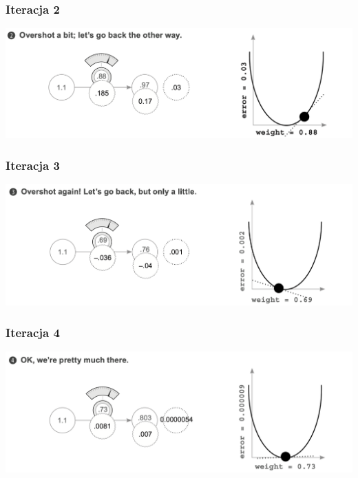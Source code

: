 \documentclass[smaller]{beamer}
\begin{document}
\begin{frame}
\frametitle{Iteracja 2}
    \centering
    \includegraphics[width=\textwidth,height=0.8\textheight,keepaspectratio]{../manifest/optim-2.png}
\end{frame}


\begin{frame}
\frametitle{Iteracja 3}
    \centering
    \includegraphics[width=\textwidth,height=0.8\textheight,keepaspectratio]{../manifest/optim-3.png}
\end{frame}


\begin{frame}
\frametitle{Iteracja 4}
    \centering
    \includegraphics[width=\textwidth,height=0.8\textheight,keepaspectratio]{../manifest/optim-4.png}
\end{frame}

\end{document}
